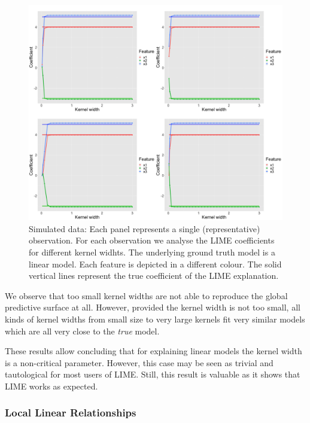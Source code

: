 \documentclass[]{krantz}
\begin{document}
\begin{figure}

{\centering \includegraphics[width=0.99\linewidth]{images/04-09-08} 

}

\caption{Simulated data: Each panel represents a single (representative) observation. For each observation we analyse the LIME coefficients for different kernel widhts. The underlying ground truth model is a linear model. Each feature is depicted in a different colour. The solid vertical lines represent the true coefficient of the LIME explanation.}\label{fig:lime-fig8}
\end{figure}

We observe that too small kernel widths are not able to reproduce the
global predictive surface at all. However, provided the kernel width is
not too small, all kinds of kernel widths from small size to very large
kernels fit very similar models which are all very close to the
\emph{true} model.

These results allow concluding that for explaining linear models the
kernel width is a non-critical parameter. However, this case may be seen
as trivial and tautological for most users of LIME. Still, this result
is valuable as it shows that LIME works as expected.

\subsubsection{Local Linear Relationships}\label{id412}
\end{document}

